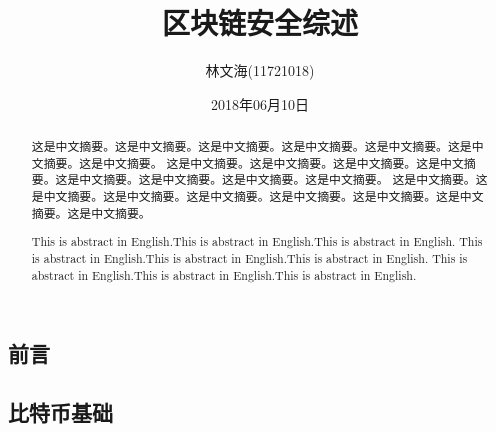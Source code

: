 \documentclass[a4paper, 11pt]{article}
\title{区块链安全综述}
\author{林文海(11721018)}
\date{2018年06月10日}
\begin{document}
    \setlength\parindent{2em}

        \renewcommand{\contentsname}{目录}  %
        \renewcommand{\abstractname}{摘要}  %
        \renewcommand{\refname}{参考文献}   %
        \renewcommand{\indexname}{索引}
        \renewcommand{\figurename}{图}
        \renewcommand{\tablename}{表}
        \renewcommand{\appendixname}{附录}
    
    \begin{CJK*}{UTF8}{gbsn}

    \maketitle
    
    \begin{abstract}
        这是中文摘要。这是中文摘要。这是中文摘要。这是中文摘要。这是中文摘要。这是中文摘要。这是中文摘要。
        这是中文摘要。这是中文摘要。这是中文摘要。这是中文摘要。这是中文摘要。这是中文摘要。这是中文摘要。这是中文摘要。
        这是中文摘要。这是中文摘要。这是中文摘要。这是中文摘要。这是中文摘要。这是中文摘要。这是中文摘要。这是中文摘要。
    \end{abstract}

    \renewcommand{\abstractname}{Abstract}

    \begin{abstract}
        This is abstract in English.This is abstract in English.This is abstract in English.
        This is abstract in English.This is abstract in English.This is abstract in English.
        This is abstract in English.This is abstract in English.This is abstract in English.
    \end{abstract}

    \section{前言}

    \subsection{比特币基础}

    \indent
    

\end{CJK*}
\end{document}
